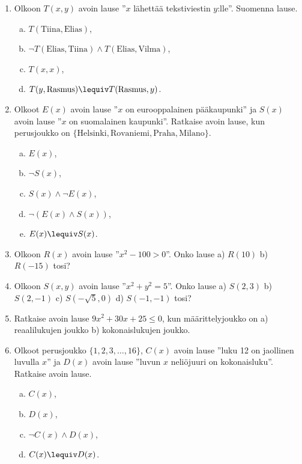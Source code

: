 \begin{enumerate}

\item
Olkoon $T(x,y)$ avoin lause ''$x$ lähettää tekstiviestin
$y$:lle''. Suomenna lause.
\begin{enumerate}[a)]
\item $T(\textrm{Tiina}, \textrm{Elias})$,
\item $\lnot T(\textrm{Elias}, \textrm{Tiina}) \land T(\textrm{Elias}, \textrm{Vilma})$,
\item $T(x, x)$,
\item $T(y, \textrm{Rasmus}) \lequiv T(\textrm{Rasmus}, y)$.
\end{enumerate}

\item
Olkoot $E(x)$ avoin lause ''$x$ on eurooppalainen
pääkaupunki'' ja $S(x)$ avoin lause ''$x$ on suomalainen
kaupunki''. Ratkaise avoin lause, kun perusjoukko on
$\{\textrm{Helsinki}, \textrm{Rovaniemi}, \textrm{Praha}, \textrm{Milano}\}$.
\begin{enumerate}[a)]
\item $E(x)$,
\item $\lnot S(x)$,
\item $S(x) \land \lnot E(x)$,
\item $\lnot (E(x) \land S(x))$,
\item $E(x) \lequiv S(x)$.
\end{enumerate}

\item
Olkoon $R(x)$ avoin lause ''$x^2 - 100 > 0$''. Onko lause
a) $R(10)$ b) $R(-15)$ tosi?

\item
Olkoon $S(x, y)$ avoin lause ''$x^2 + y^2 = 5$''. Onko
lause a) $S(2, 3)$ b) $S(2, -1)$ c) $S(-\sqrt{5}, 0)$ d)
$S(-1, -1)$ tosi?

\item
Ratkaise avoin lause $9x^2 + 30x + 25 \le 0$, kun
määrittelyjoukko on a) reaalilukujen joukko b)
kokonaislukujen joukko.

\item
Olkoot perusjoukko $\{ 1, 2, 3, \ldots , 16\}$, $C(x)$
avoin lause ''luku 12 on jaollinen luvulla $x$'' ja $D(x)$ avoin lause ''luvun $x$ neliöjuuri on kokonaisluku''.
Ratkaise avoin lause.
\begin{enumerate}[a)]
\item $C(x)$,
\item $D(x)$,
\item $\lnot C(x) \land D(x)$,
\item $C(x) \lequiv D(x)$.
\end{enumerate}


\end{enumerate}
